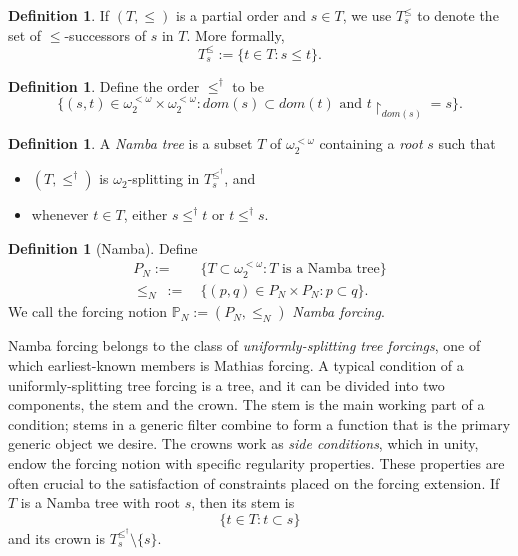\documentclass[12pt, twoside]{memoir}
\numberwithin{equation}{section}
\theoremstyle{definition}
\newtheorem{defi}[thm]{Definition}
\theoremstyle{remark}
\theoremstyle{definition}
\theoremstyle{definition}
\theoremstyle{definition}
\theoremstyle{remark}
\begin{document}
\begin{defi}
If $(T, \leq)$ is a partial order and $s \in T$, we use $T_s^{\leq}$ to denote the set of $\leq$-successors of $s$ in $T$. More formally, $$T_s^{\leq} := \{t \in T : s \leq t\}.$$ 
\end{defi}

\begin{defi}
Define the order $\leq^{\dagger}$ to be $$\{(s, t) \in \omega_2^{< \omega} \times \omega_2^{< \omega} : dom(s) \subset dom(t) \text{ and } t \! \restriction_{dom(s)} = s\}.$$
\end{defi}

\begin{defi}
A \emph{Namba tree} is a subset $T$ of $\omega_2^{< \omega}$ containing a \emph{root} $s$ such that
\begin{itemize}
    \item $(T, \leq^{\dagger})$ is $\omega_2$-splitting in $T_s^{\leq^{\dagger}}$, and
    \item whenever $t \in T$, either $s \leq^{\dagger} t$ or $t \leq^{\dagger} s$. 
\end{itemize}
\end{defi}

\begin{defi}[Namba]
Define
\begin{align*}
    P_N := \ & \{T \subset \omega_2^{< \omega} : T \text{ is a Namba tree}\} \\
    \leq_N \ := \ & \{(p, q) \in P_N \times P_N : p \subset q\} \text{.}
\end{align*}
We call the forcing notion $\mathbb{P}_N := (P_N, \leq_N)$ \emph{Namba forcing}.
\end{defi}

Namba forcing belongs to the class of \emph{uniformly-splitting tree forcings}, one of which earliest-known members is Mathias forcing. A typical condition of a uniformly-splitting tree forcing is a tree, and it can be divided into two components, the stem and the crown. The stem is the main working part of a condition; stems in a generic filter combine to form a function that is the primary generic object we desire. The crowns work as \emph{side conditions}, which in unity, endow the forcing notion with specific regularity properties. These properties are often crucial to the satisfaction of constraints placed on the forcing extension. If $T$ is a Namba tree with root $s$, then its stem is $$\{t \in T : t \subset s\}$$ and its crown is $T_s^{\leq^{\dagger}} \setminus \{s\}$.
\end{document}
